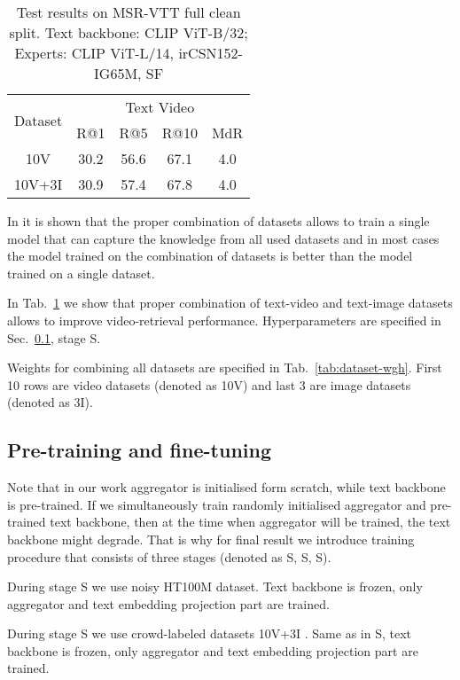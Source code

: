 \begin{table}
  \centering
  \caption{ Test results on MSR-VTT full clean split. Text backbone: CLIP ViT-B/32; Experts: CLIP ViT-L/14, irCSN152-IG65M, SF}
  \label{tab:10v}
  
  \begin{tabular}{|c|*{4}c|}
		  \toprule
	       \multirow{2}{*}{Dataset}  & \multicolumn{4}{c|}{Text  Video} \\ 
		 & R@1 & R@5 & R@10 & MdR \\
		  \midrule
    10V     &  30.2    & 56.6 & 67.1  &  4.0    \\
    10V+3I  &  30.9    & 57.4 & 67.8  &  4.0     \\
		  \bottomrule
	    \end{tabular}
\end{table}
In \cite{mdmmt} it is shown that the proper combination of datasets allows to train a single model that can capture the knowledge from all used datasets and in most cases the 
model trained on the combination of datasets is better than the model trained on a single dataset. 

In Tab.~\ref{tab:10v} we show that proper combination of text-video and text-image datasets allows to improve video-retrieval performance. Hyperparameters are specified in Sec.~\ref{ssec:stages}, stage S.

Weights for combining all datasets are specified in Tab.~\ref{tab:dataset-wgh}. First 10 rows are video datasets (denoted as 10V) and last 3 are image datasets (denoted as 3I). 

\subsection{Pre-training and fine-tuning}\label{ssec:stages}
Note that in our work aggregator is initialised form scratch, while text backbone is pre-trained. If we simultaneously train randomly initialised aggregator and pre-trained text backbone, then at the time when aggregator will be trained, the text backbone might degrade. That is why for final result we introduce training procedure that consists of three stages (denoted as S, S, S).

During stage S we use noisy HT100M dataset. Text backbone is frozen, only aggregator and text embedding projection part are trained.

During stage S we use crowd-labeled datasets 10V+3I . Same as in S, text backbone is frozen, only aggregator and text embedding projection part are trained.

